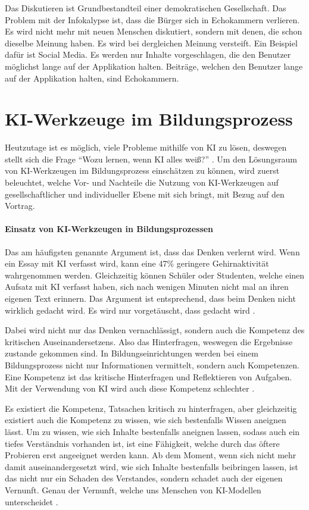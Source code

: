 \documentclass[11pt]{article}
\begin{document}
Das Diskutieren ist Grundbestandteil einer demokratischen Gesellschaft. Das Problem mit der Infokalypse ist, dass die Bürger sich in Echokammern verlieren. Es wird nicht mehr mit neuen Menschen diskutiert, sondern mit denen, die schon dieselbe Meinung haben. Es wird bei dergleichen Meinung versteift. Ein Beispiel dafür ist Social Media. Es werden nur Inhalte vorgeschlagen, die den Benutzer möglichst lange auf der Applikation halten. Beiträge, welchen den Benutzer lange auf der Applikation halten, sind Echokammern.

\section{KI-Werkzeuge im Bildungsprozess}
Heutzutage ist es möglich, viele Probleme mithilfe von KI zu lösen, deswegen stellt sich die Frage \enquote{Wozu lernen, wenn KI alles weiß?} \cite{WozuLernenNochGutIst}. Um den Lösungsraum von KI-Werkzeugen im Bildungsprozess einschätzen zu können, wird zuerst beleuchtet, welche Vor- und Nachteile die Nutzung von KI-Werkzeugen auf gesellschaftlicher und individueller Ebene mit sich bringt, mit Bezug auf den Vortrag. 

\paragraph{Einsatz von KI-Werkzeugen in Bildungsprozessen}

Das am häufigsten genannte Argument ist, dass das Denken verlernt wird. Wenn ein Essay mit KI verfasst wird, kann eine 47\% geringere Gehirnaktivität wahrgenommen werden. Gleichzeitig können Schüler oder Studenten, welche einen Aufsatz mit KI verfasst haben, sich nach wenigen Minuten nicht mal an ihren eigenen Text erinnern. Das Argument ist entsprechend, dass beim Denken nicht wirklich gedacht wird. Es wird nur vorgetäuscht, dass gedacht wird \cite{WozuLernenNochGutIst}. 

Dabei wird nicht nur das Denken vernachlässigt, sondern auch die Kompetenz des kritischen Auseinandersetzens. Also das Hinterfragen, weswegen die Ergebnisse zustande gekommen sind. In Bildungseinrichtungen werden bei einem Bildungsprozess nicht nur Informationen vermittelt, sondern auch Kompetenzen. Eine Kompetenz ist das kritische Hinterfragen und Reflektieren von Aufgaben. Mit der Verwendung von KI wird auch diese Kompetenz schlechter \cite{WozuLernenNochGutIst}.

Es existiert die Kompetenz, Tatsachen kritisch zu hinterfragen, aber gleichzeitig existiert auch die Kompetenz zu wissen, wie sich bestenfalls Wissen aneignen lässt. Um zu wissen, wie sich Inhalte bestenfalls aneignen lassen, sodass auch ein tiefes Verständnis vorhanden ist, ist eine Fähigkeit, welche durch das öftere Probieren erst angeeignet werden kann. Ab dem Moment, wenn sich nicht mehr damit auseinandergesetzt wird, wie sich Inhalte bestenfalls beibringen lassen, ist das nicht nur ein Schaden des Verstandes, sondern schadet auch der eigenen Vernunft. Genau der Vernunft, welche uns Menschen von KI-Modellen unterscheidet \cite{WozuLernenNochGutIst}.  
\end{document}
